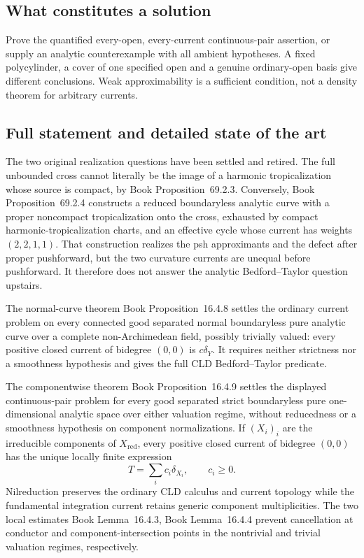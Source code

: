 \documentclass[11pt,a4paper]{article}
\theoremstyle{definition}
\theoremstyle{remark}
\begin{document}
\subsection{What constitutes a solution}
Prove the quantified every-open, every-current continuous-pair assertion, or supply an analytic counterexample with all ambient hypotheses. A fixed polycylinder, a cover of one specified open and a genuine ordinary-open basis give different conclusions. Weak approximability is a sufficient condition, not a density theorem for arbitrary currents.

\subsection{Full statement and detailed state of the art}
\label{sec:ch72-bedford-taylor}

The two original realization questions have been settled and retired.  The
full unbounded cross cannot literally be the image of a harmonic
tropicalization whose source is compact, by
Book Proposition~69.2.3.  Conversely,
Book Proposition~69.2.4 constructs a reduced
boundaryless analytic curve with a proper noncompact tropicalization onto
the cross, exhausted by compact harmonic-tropicalization charts, and an
effective cycle whose current has weights \((2,2,1,1)\).  That construction
realizes the psh approximants and the defect after proper pushforward, but
the two curvature currents are unequal before pushforward.  It therefore
does not answer the analytic Bedford--Taylor question upstairs.

The normal-curve theorem
Book Proposition~16.4.8 settles the
ordinary current problem on every connected good separated normal
boundaryless pure analytic curve over a complete non-Archimedean field,
possibly trivially valued: every positive closed current of bidegree
\((0,0)\) is \(c\delta_Y\).  It requires neither strictness nor a smoothness
hypothesis and gives the full CLD Bedford--Taylor predicate.

The componentwise theorem
Book Proposition~16.4.9 settles the displayed
continuous-pair problem for every good separated strict boundaryless pure
one-dimensional analytic space over either valuation regime, without
reducedness or a smoothness hypothesis on component normalizations.  If
\((X_i)_i\) are the irreducible components of \(X_{\mathrm{red}}\), every
positive closed current of bidegree \((0,0)\) has the unique locally finite
expression
\[
                         T=\sum_i c_i\delta_{X_i},
                         \qquad c_i\geq0.
\]
Nilreduction preserves the ordinary CLD calculus and current topology while
the fundamental integration current retains generic component
multiplicities.  The two local estimates
Book Lemma~16.4.3, Book Lemma~16.4.4 prevent cancellation at conductor
and component-intersection points in the nontrivial and trivial valuation
regimes, respectively.
\end{document}

